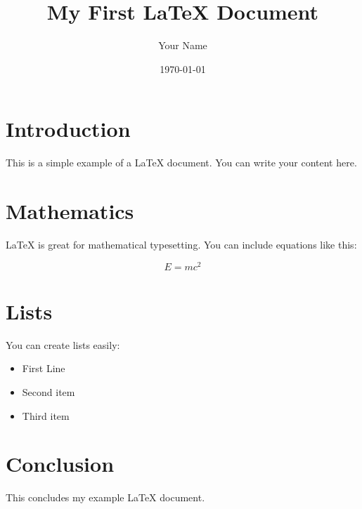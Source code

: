 \documentclass{article}
\title{My First LaTeX Document}
\author{Your Name}
\date{\today}
\begin{document}
\maketitle

\section{Introduction}

This is a simple example of a LaTeX document. You can write your content here.

\section{Mathematics}

LaTeX is great for mathematical typesetting. You can include equations like this:

\[ E = mc^2 \]

\section{Lists}

You can create lists easily:

\begin{itemize}
    \item First Line
  \item Second item
  \item Third item
\end{itemize}

\section{Conclusion}

This concludes my example LaTeX document.
\end{document}
